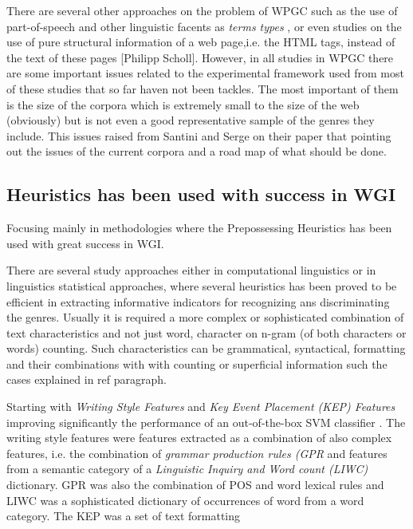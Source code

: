 There are several other approaches on the problem of WPGC such as the use of part-of-speech and other linguistic facents as \textit{terms types} \parencite{feldman2009classifying,santini2005linguistic}, or even studies on the use of pure structural information of a web page,i.e. the HTML tags, instead of the text of these pages {[}Philipp Scholl{]}. However, in all studies in WPGC there are some important issues related to the experimental framework used from most of these studies that so far haven not been tackles. The most important of them is the size of the corpora which is extremely small to the size of the web (obviously) but is not even a good representative sample of the genres they include. This issues raised from Santini and Serge \parencite{santini2009web} on their paper that pointing out the issues of the current corpora and a road map of what should be done. 

\subsection{Heuristics has been used with success in WGI}\label{chap:relevant_work:sec:features:subsec:heuristics}
Focusing mainly in methodologies where the Prepossessing Heuristics has been used with great success in WGI.

There are several study approaches either in computational linguistics or in linguistics statistical approaches, where several heuristics has been proved to be efficient in extracting informative indicators for recognizing ans discriminating the genres. Usually it is required a more complex or sophisticated combination of text characteristics and not just word, character on n-gram (of both characters or words) counting. Such characteristics can be grammatical, syntactical, formatting and their combinations with  with counting or superficial information such the cases explained in ref{} paragraph.

Starting with \textit{Writing Style Features} and \textit{Key Event Placement (KEP) Features} improving significantly the performance of an out-of-the-box SVM classifier \parencite{dai2018fine}.  The writing style features were features extracted as a combination of also complex features, i.e. the combination of \textit{grammar production rules (GPR} and features from a semantic category of a \textit{Linguistic Inquiry and Word count (LIWC)} dictionary. GPR was also the combination of POS and word lexical rules and LIWC was a sophisticated dictionary of occurrences of word from a word category. The KEP was a set of text formatting

